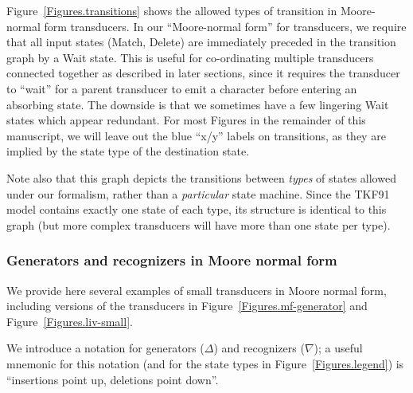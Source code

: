 \documentclass{article}
\newcommand{\figref}[1]{Figure~\ref{Figures.#1}}
\newcommand\generate{\Delta}
\newcommand\recognize{\nabla}
\begin{document}
\figref{transitions} shows the allowed types of transition in Moore-normal form transducers.
In our ``Moore-normal form'' for transducers, we require that all input states (Match, Delete)
are immediately preceded in the transition graph by a Wait state.
This is useful for co-ordinating multiple transducers connected together as described in later sections,
since it requires
the transducer to ``wait'' for a parent transducer to emit a character before entering an
absorbing state. 
The downside is that we sometimes have a few  lingering Wait states which appear redundant.  
For most Figures in the remainder of this manuscript, we will leave out the blue ``x/y'' labels on transitions,
as they are implied by the state type of the destination state.

Note also that this graph depicts the transitions between {\em types} of states  allowed under our formalism,
rather than a {\em particular} state machine.  
Since the TKF91 model contains exactly one state of each type,
its structure is identical to this graph 
(but more complex transducers will have more than one state per type).



\subsubsection{Generators and recognizers in Moore normal form}
We provide here several examples of small transducers in Moore normal form,
including versions of the transducers in \figref{mf-generator}
and \figref{liv-small}.

We introduce a notation for generators ($\generate$) and recognizers ($\recognize$);
a useful mnemonic for this notation (and for the state types in \figref{legend})
is ``insertions point up, deletions point down''.
\end{document}
